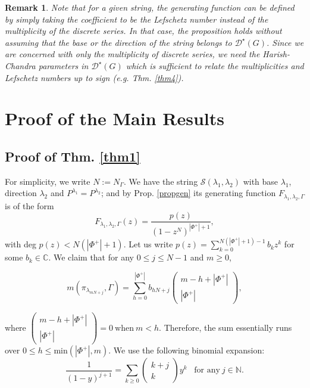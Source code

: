 \documentclass[11 pt]{amsart}
\newcommand{\N}{{\mathbb N}}
\newcommand{\C}{{\mathbb C}}
\theoremstyle{definition}
\newtheorem{remark}{Remark}[section]
\numberwithin{equation}{section}
\begin{document}
\begin{remark}
\textit{Note that for a given string, the generating function can be defined by simply taking the coefficient to be the Lefschetz number instead of the multiplicity of the discrete series. In that case, the proposition holds without assuming that the base or the direction of the string belongs to $\mathcal{D}^{\star}(G)$. Since we are concerned with only the multiplicity of discrete series, we need the Harish-Chandra parameters in $\mathcal{D}^{\star}(G)$ which is sufficient to relate the multiplicities and Lefschetz numbers up to sign (e.g. Thm. \ref{thm4}).}
\end{remark}


\section{Proof of the Main Results}

\subsection{Proof of Thm. \ref{thm1}}\label{proofthm1}


For simplicity, we write $N:=N_{\Gamma}$. We have the string $\mathcal{S}(\lambda_1, \lambda_2)$ with base $\lambda_1$, direction $\lambda_2$ and $P^{\lambda_1}=P^{\lambda_2}$; and by Prop. \ref{propgen} its generating function $F_{\lambda_1, \lambda_2, \Gamma }$ is of the form 
$$F_{\lambda_1, \lambda_2, \Gamma } (z) = \frac{p(z)}{(1-z^{N})^{|\Phi^+|+1}},$$ 
with deg $p(z) < N(|\Phi^+|+1)$. Let us write $p(z) = \sum\limits_{k=0}^{N(|\Phi^+|+1)-1} b_k z^k$ for some $b_k \in \C$. We claim that for any $0 \leq j \leq N-1$ and $m \geq0$, 

$$m(\pi_{\lambda_{mN+j}},\Gamma) = \sum\limits_{h=0}^{|\Phi^+|} b_{hN+j} \left( \begin{matrix} m-h+|\Phi^+| \\ |\Phi^+| \end{matrix} \right),$$ 

\noindent where $ \left( \begin{matrix} m-h+|\Phi^+| \\ |\Phi^+| \end{matrix} \right) =0\ \text{when}\ m<h$. Therefore, the sum essentially runs over $0 \leq h \leq \text{min}(|\Phi^+|,m)$. We use the following binomial expansion: $$\frac{1}{(1-y)^{j+1}} = \sum_{k \geq 0} \left( \begin{matrix} k+j \\ k \end{matrix} \right) y^k \hspace{10pt} \text{for any}\ j \in \N.$$ 
\end{document}
